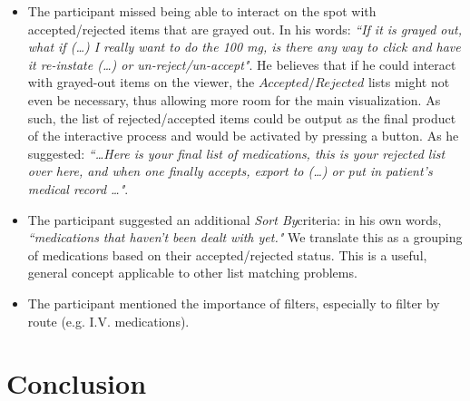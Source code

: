 \documentclass{chi2009}
\newcommand{\AcceptedRejected}{\textit{Accepted/Rejected}}
\newcommand{\SortBy}{\textit{Sort By}}
\begin{document}
\begin{itemize}
\item The participant missed being able to interact on the spot with accepted/rejected items that are grayed out. In his words: \textit{``If it is grayed out, what if (\dots) I really want to do the 100 mg, is there any way to click and have it re-instate (\dots) or un-reject/un-accept"}. He believes that if he could interact with grayed-out items on the viewer, the $\AcceptedRejected$ lists might not even be necessary, thus allowing more room for the main visualization. As such, the list of rejected/accepted items could be output as the final product of the interactive process and would be activated by pressing a button. As he suggested: \textit{``\dots Here is your final list of medications, this is your rejected list over here, and when one finally accepts, export to (\dots) or put in patient's medical record \dots"}.
\item The participant suggested an additional \SortBy criteria: in his own words, \textit{``medications that haven't been dealt with yet."} We translate this as a grouping of medications based on their accepted/rejected status. This is a useful, general concept applicable to other list matching problems.
\item The participant mentioned the importance of filters, especially to filter by route (e.g. I.V. medications).  
\end{itemize}

\section{Conclusion}



\end{document}
